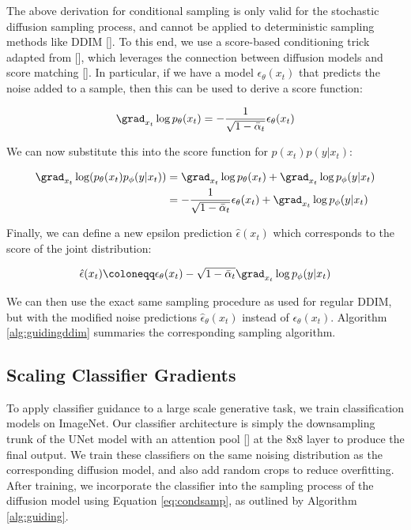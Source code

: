 The above derivation for conditional sampling is only valid for the stochastic diffusion sampling process, and cannot be applied to deterministic sampling methods like DDIM []. To this end, we use a score-based conditioning trick adapted from \citeauthor{sde} [], which leverages the connection between diffusion models and score matching []. In particular, if we have a model $\epsilon_{\theta}(x_t)$ that predicts the noise added to a sample, then this can be used to derive a score function:

\begin{alignat}{1}\grad_{x_t} \log p_{\theta}(x_t) = -\frac{1}{\sqrt{1-\bar{\alpha}_t}} \epsilon_{\theta}(x_t)
\end{alignat}

We can now substitute this into the score function for $p(x_t)p(y|x_t)$:

\begin{alignat}{2}
    \grad_{x_t} \log(p_{\theta}(x_t) p_{\phi}(y|x_t)) &= \grad_{x_t} \log p_{\theta}(x_t) + \grad_{x_t} \log p_{\phi}(y|x_t) \\
    &= -\frac{1}{\sqrt{1-\bar{\alpha}_t}} \epsilon_{\theta}(x_t) + \grad_{x_t} \log p_{\phi}(y|x_t)
\end{alignat}

Finally, we can define a new epsilon prediction $\hat{\epsilon}(x_t)$ which corresponds to the score of the joint distribution:

\begin{alignat}{1}\hat{\epsilon}(x_t) \coloneqq \epsilon_{\theta}(x_t) - \sqrt{1-\bar{\alpha}_t} \grad_{x_t} \log p_{\phi}(y|x_t)
\end{alignat}

We can then use the exact same sampling procedure as used for regular DDIM, but with the modified noise predictions $\hat{\epsilon}_{\theta}(x_t)$ instead of $\epsilon_{\theta}(x_t)$. Algorithm \ref{alg:guidingddim} summaries the corresponding sampling algorithm. 

\subsection{Scaling Classifier Gradients}
\label{sec:scalingcg}

To apply classifier guidance to a large scale generative task, we train classification models on ImageNet. Our classifier architecture is simply the downsampling trunk of the UNet model with an attention pool [] at the 8x8 layer to produce the final output. We train these classifiers on the same noising distribution as the corresponding diffusion model, and also add random crops to reduce overfitting. After training, we incorporate the classifier into the sampling process of the diffusion model using Equation \ref{eq:condsamp}, as outlined by Algorithm \ref{alg:guiding}.

